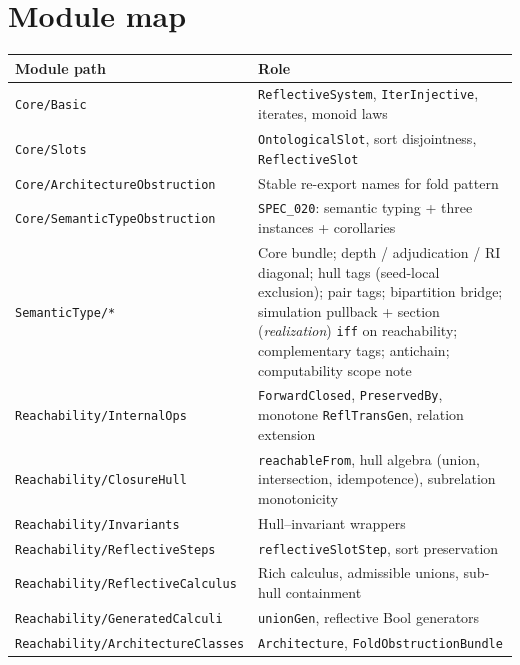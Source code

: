 \documentclass[11pt]{article}
\theoremstyle{plain}
\theoremstyle{definition}
\theoremstyle{remark}
\begin{document}
\appendix

\section{Module map}\label{app:modules}

\small
\begin{center}
\begin{tabular}{@{}p{}p{}@{}}
\toprule
\textbf{Module path} & \textbf{Role} \\
\midrule
\texttt{Core/Basic} & \texttt{ReflectiveSystem}, \texttt{IterInjective}, iterates, monoid laws \\
\texttt{Core/Slots} & \texttt{OntologicalSlot}, sort disjointness, \texttt{ReflectiveSlot} \\
\texttt{Core/ArchitectureObstruction} & Stable re-export names for fold pattern \\
%
\texttt{Core/SemanticTypeObstruction} & \texttt{SPEC\_020}: semantic typing + three instances + corollaries \\
\texttt{SemanticType/*} & Core bundle; depth / adjudication / RI diagonal; hull tags (seed-local exclusion); pair tags; bipartition bridge; simulation pullback + section (\emph{realization}) \texttt{iff} on reachability; complementary tags; antichain; computability scope note \\
\midrule
\texttt{Reachability/InternalOps} & \texttt{ForwardClosed}, \texttt{PreservedBy}, monotone \texttt{ReflTransGen}, relation extension \\
\texttt{Reachability/ClosureHull} & \texttt{reachableFrom}, hull algebra (union, intersection, idempotence), subrelation monotonicity \\
\texttt{Reachability/Invariants} & Hull--invariant wrappers \\
\texttt{Reachability/ReflectiveSteps} & \texttt{reflectiveSlotStep}, sort preservation \\
\texttt{Reachability/ReflectiveCalculus} & Rich calculus, admissible unions, sub-hull containment \\
\texttt{Reachability/GeneratedCalculi} & \texttt{unionGen}, reflective Bool generators \\
\texttt{Reachability/ArchitectureClasses} & \texttt{Architecture}, \texttt{FoldObstructionBundle} \\
\midrule

\end{tabular}
\end{center}
\end{document}
